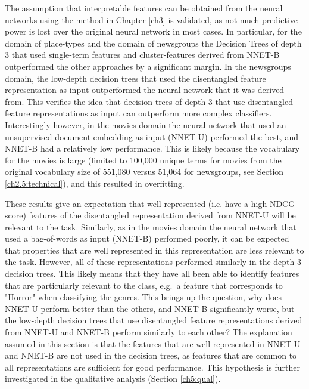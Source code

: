 The assumption that interpretable features can be obtained from the neural networks using the method in Chapter \ref{ch3} is validated, as not much predictive power is lost over the original neural network in most cases. In particular, for the domain of place-types and the domain of newsgroups the Decision Trees of depth 3 that used  single-term features and cluster-features derived from NNET-B outperformed the other approaches by a significant margin. In the newsgroups domain, the low-depth decision trees that used the disentangled feature representation as input outperformed the neural network that  it was derived from. This verifies  the idea that decision trees of depth 3 that use disentangled feature representations as input can outperform more complex classifiers. Interestingly however, in the  movies domain the neural network that used an unsupervised document embedding as input (NNET-U) performed the best, and NNET-B had a relatively low performance.  This is likely because the vocabulary for the movies is large (limited to 100,000 unique terms for movies from the original vocabulary size of 551,080 versus 51,064 for newsgroups, see Section \ref{ch2.5:technical}), and this resulted in overfitting. 

These results give an  expectation that well-represented (i.e. have a high NDCG score) features of the disentangled representation derived from NNET-U  will be relevant to the task. Similarly, as in the movies domain the neural network that used a  bag-of-words as input (NNET-B) performed poorly, it can be expected that properties that are well represented in this representation are less relevant to the task. However, all of these representations performed similarly in the depth-3 decision trees. This likely means that they  have all been able to identify  features that are particularly relevant to the class, e.g.\ a feature that corresponds to "Horror" when classifying the genres. This brings up the question, why does NNET-U perform better than the others, and NNET-B significantly worse, but the low-depth decision trees that use disentangled feature representations derived from NNET-U and NNET-B perform similarly to each other? The explanation assumed in this section is that the features that are well-represented in NNET-U and NNET-B are not used in the decision trees, as features that are common to all representations are sufficient for good performance. This hypothesis is further investigated in the qualitative analysis (Section \ref{ch5:qual}).



